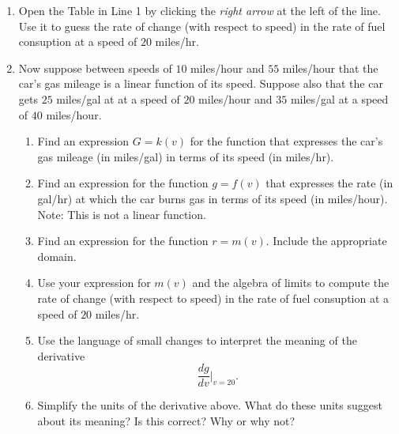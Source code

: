 \documentclass{ximera}
\begin{document}
\begin{question}
\begin{enumerate}
\item Open the Table in Line 1 by clicking the \emph{right arrow} at the left of the line. Use it to guess the rate of change (with respect to speed) in the  rate of fuel consuption at a speed of $20$ miles/hr.

\item Now suppose between speeds of $10$ miles/hour and $55$ miles/hour that the car's gas mileage is a linear function of its speed. Suppose also that the car gets $25$ miles/gal at at a speed of $20$ miles/hour and $35$ miles/gal at a speed of $40$ miles/hour.

\begin{enumerate}
\item Find an expression $G=k(v)$ for the function that expresses the car's gas mileage (in miles/gal) in terms of its speed (in miles/hr).

\item Find an expression for the function $g=f(v)$ that expresses the rate (in gal/hr) at which the car burns gas in terms of its speed (in miles/hour). Note: This is not a linear function.

\item Find an expression for the function $r=m(v)$. Include the appropriate domain.

\item Use your expression for $m(v)$ and the algebra of limits to compute the rate of change (with respect to speed) in the rate of fuel consuption at a speed of $20$ miles/hr.

\item Use the language of small changes to interpret the meaning of the derivative
\[
   \frac{dg}{dv}\Big|_{v=20} .
\]

\item Simplify the units of the derivative above. What do these units suggest about its meaning? Is this correct? Why or why not?

\end{enumerate}

\end{enumerate}
\end{question}
\end{document}
